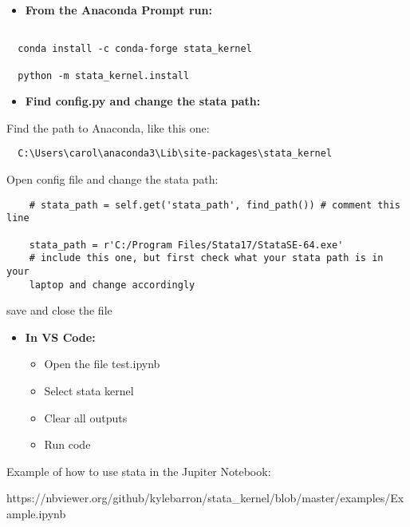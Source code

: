 \documentclass[12pt]{article}
\begin{document}
\begin{itemize}
  \item \textbf{From the Anaconda Prompt run:} 
\end{itemize}

\begin{verbatim}

  conda install -c conda-forge stata_kernel

  python -m stata_kernel.install

\end{verbatim}
  

\begin{itemize}
  \item \textbf{Find config.py and change the stata path:}
\end{itemize}

Find the path to Anaconda, like this one:

\begin{verbatim}
  C:\Users\carol\anaconda3\Lib\site-packages\stata_kernel
\end{verbatim}

  Open config file and change the stata path:

  \begin{verbatim}
    # stata_path = self.get('stata_path', find_path()) # comment this line 

    stata_path = r'C:/Program Files/Stata17/StataSE-64.exe' 
    # include this one, but first check what your stata path is in your 
    laptop and change accordingly

  \end{verbatim}
  
  save and close the file

  
  
\begin{itemize}  
  \item \textbf{In VS Code:} 
    \begin{itemize}
      \item Open the file test.ipynb
      \item Select stata kernel
      \item Clear all outputs
      \item Run code
    \end{itemize}
\end{itemize}


Example of how to use stata in the Jupiter Notebook:

https://nbviewer.org/github/kylebarron/stata_kernel/blob/master/examples/Example.ipynb
\end{document}
